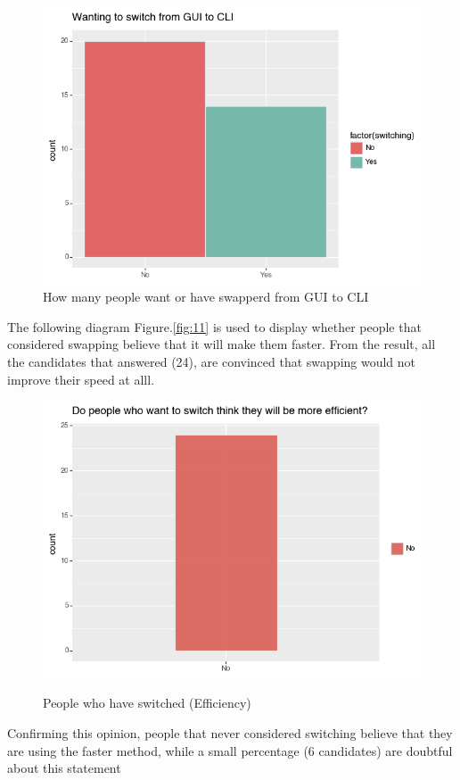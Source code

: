 \documentclass[]{report}
\begin{document}
		\begin{figure}[H]
			\centering
			\includegraphics[width=0.75\linewidth]{SwitchingGUI}
			\caption{How many people want or have swapperd from GUI to CLI}
			\label{fig: 14}
		\end{figure}
		The following diagram Figure.\ref{fig:11} is used to display whether people that considered swapping believe that it will make them faster. From the result, all the candidates that answered (24), are convinced that swapping would not improve their speed at alll.
		\begin{figure}[H]
			\centering
			\includegraphics[width=0.75\linewidth]{EfficientSwitch}\\
			\caption{People who have switched (Efficiency)}
			\label{fig: 9}
		\end{figure}
		Confirming this opinion, people that never considered switching believe that they are using the faster method, while a small percentage (6 candidates) are doubtful about this statement
\end{document}
